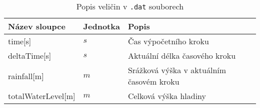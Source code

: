 
\begin{table}[h!]
 

 \centering
 \caption{Popis veličin  v {\tt.dat} souborech}
\label{tab:vystupydat}

 \begin{tabular}{llp{}}
  \hline  \hline
 Název sloupce    & Jednotka    & Popis       \\ 
  \hline
 time[s]          &   $s$      &  Čas výpočetního kroku          \\
 deltaTime[s]     &   $s$        &  Aktuální délka časového kroku  \\
 rainfall[m]      &  $m$         &  Srážková výška v aktuálním časovém kroku \\
 totalWaterLevel[m]	  &   $m$	&  Celková výška hladiny  \\ 

\end{tabular}
\end{table}
